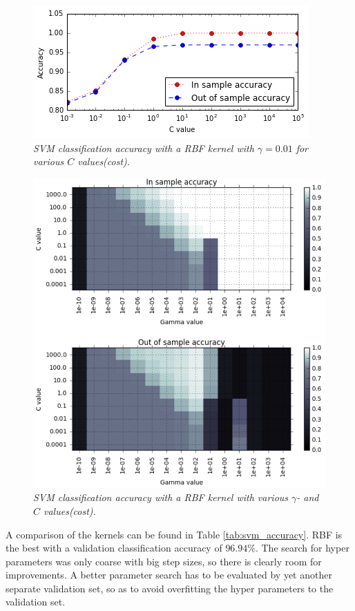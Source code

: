 \documentclass[a4paper,10pt,article,oneside,english]{memoir}
\let\oldcaption\caption
\renewcommand{\caption}[1]{\oldcaption{\emph{#1}}}
\begin{document}
	\begin{figure}[h!]
		\centering
		\includegraphics[width=0.7\linewidth]{svm_rbf.PNG}
		\caption{SVM classification accuracy with a RBF kernel with $\gamma=0.01$ for various $C$ values(cost).}
		\label{fig:svm_rbf}
	\end{figure}
	
	\begin{figure}[h!]
		\centering
		\includegraphics[width=0.9\linewidth]{svm_rbf_grid.PNG}
		\caption{SVM classification accuracy with a RBF kernel with various $\gamma$- and $C$ values(cost).}
		\label{fig:svm_rbf_grid}
	\end{figure}
	
	A comparison of the kernels can be found in Table \ref{tab:svm_accuracy}. RBF is the best with a validation classification accuracy of $96.94\%$. The search for hyper parameters was only coarse with big step sizes, so there is clearly room for improvements. A better parameter search has to be evaluated by yet another separate validation set, so as to avoid overfitting the hyper parameters to the validation set. 
	
\end{document}
